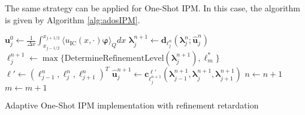 The same strategy can be applied for One-Shot IPM. In this case, the algorithm is given by Algorithm \ref{alg:adosIPM}.
\begin{algorithm}[H]
\begin{algorithmic}[1]
\State $\bm{u}_j^0 \leftarrow \frac{1}{\Delta x} \int_{x_{j-1/ 2}}^{x_{j+1/ 2}} \langle u_{\text{IC}}(x, \cdot) \bm{\varphi} \rangle_Q dx$
\EndFor
{}
\State $\bm{\lambda}_j^{n+1} \leftarrow \bm{d}_{\ell_j^n}(\bm{\lambda}_{j}^{n};\bm{\hat u}_j^{n})$
\State $\ell_j^{n+1}\leftarrow \max\{\text{DetermineRefinementLevel}\left(\bm{\lambda}_j^{n+1}\right),\ell_m^*\}$
\State $\bm\ell' \leftarrow (\ell_{j-1}^n,\ell_{j}^n,\ell_{j+1}^n)^T$
\State $\bm{\hat u}_j^{n+1} \leftarrow \bm{c}_{\ell_j^{n+1}}^{\bm\ell'}(\bm{\lambda}_{j-1}^{n+1},\bm{\lambda}_j^{n+1},\bm{\lambda}_{j+1}^{n+1})$
\EndFor
\State $n \leftarrow n+1$
\State $m \leftarrow m+1$
\EndIf
\EndWhile
\end{algorithmic}
\caption{Adaptive One-Shot IPM implementation with refinement retardation}
\label{alg:adosIPM}
\end{algorithm}

